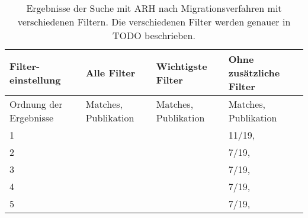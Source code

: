 \begin{table}
  \centering
  \begin{tabular}{m{2cm} m{3.5cm} m{3.5cm} m{3.5cm}}
    \toprule
    \textbf{Filter-einstellung} & \textbf{Alle Filter} & \textbf{Wichtigste Filter} & \textbf{Ohne zusätzliche Filter} \\ \hline
    Ordnung der Ergebnisse & Matches, Publikation & Matches, Publikation & Matches, Publikation \\ \midrule
    1 & & & 11/19, \cite{arh-result-no-filter-1}  \\ \hline
    2 & & & 7/19, \cite{arh-result-no-filter-2} \\ \hline
    3 & & & 7/19, \cite{arh-result-no-filter-3} \\ \hline
    4 & & &  7/19, \cite{arh-result-no-filter-4} \\ \hline
    5 & & &  7/19, \cite{arh-result-no-filter-5} \\
    \bottomrule
  \end{tabular}
  \caption[Surchergebnisse des ARH von Migrationsverfahren mit verschiedenen Filtern]{
    Ergebnisse der Suche mit ARH nach Migrationsverfahren mit verschiedenen Filtern.
    Die verschiedenen Filter werden genauer in TODO beschrieben.
  }
  \label{tab:phase2-filter-results}
\end{table}
